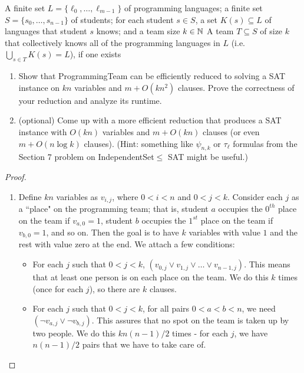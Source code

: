 \documentclass[11pt]{article}
\begin{document}
\begin{enumerate}
{A finite set $L=\{\ell_0,\ldots,\ell_{m-1}\}$ of programming languages; a finite set 
$S=\{s_0,\ldots,s_{n-1}\}$ of students; for each student $s\in S$, a set $K(s)\subseteq L$ of languages that student $s$ knows; and a team size $k\in \mathbb{N}$}
{A team $T\subseteq S$ of size $k$ that collectively knows all of the programming languages in $L$ (i.e. $\bigcup_{s\in T} K(s)=L$), if one exists}

\begin{enumerate}
    \item 
Show that ProgrammingTeam can be efficiently reduced to solving a SAT instance on $kn$ variables and $m+O(kn^2)$ clauses.  Prove the correctness of your reduction and analyze its runtime.

\item 
(optional\footnotemark[1])
Come up with a more efficient reduction that produces a SAT instance with $O(kn)$ variables and $m+O(kn)$ clauses (or even $m+O(n\log k)$ clauses). (Hint: something like $\psi_{n,k}$ or $\tau_\ell$ formulas from the Section 7 problem on IndependentSet$\leq$ SAT might be useful.)
\end{enumerate}

\begin{proof}
\begin{enumerate}

\item Define $kn$ variables as $v_{i, j}$, where $0 < i < n$ and $0 < j < k$. Consider each $j$ as a ``place" on the programming team; that is, student $a$ occupies the $0^{th}$ place on the team if $v_{a, 0} = 1$, student $b$ occupies the $1^{st}$ place on the team if $v_{b, 0} = 1$, and so on. Then the goal is to have $k$ variables with value $1$ and the rest with value zero at the end. We attach a few conditions:

\begin{itemize}
\item For each $j$ such that $0 < j < k$, $(v_{0, j} \vee v_{1, j} \vee \dots \vee v_{n  - 1, j})$. This means that at least one person is on each place on the team. We do this $k$ times (once for each $j$), so there are $k$ clauses.

\item For each $j$ such that $0 < j < k$, for all pairs $0 < a < b < n$, we need $(\neg v_{a, j} \vee \neg v_{b, j})$. This assures that no spot on the team is taken up by two people. We do this $kn(n - 1)/2$ times - for each $j$, we have $n(n - 1)/2$ pairs that we have to take care of.


\end{itemize}
\end{enumerate}
\end{proof}
\end{enumerate}
\end{document}
